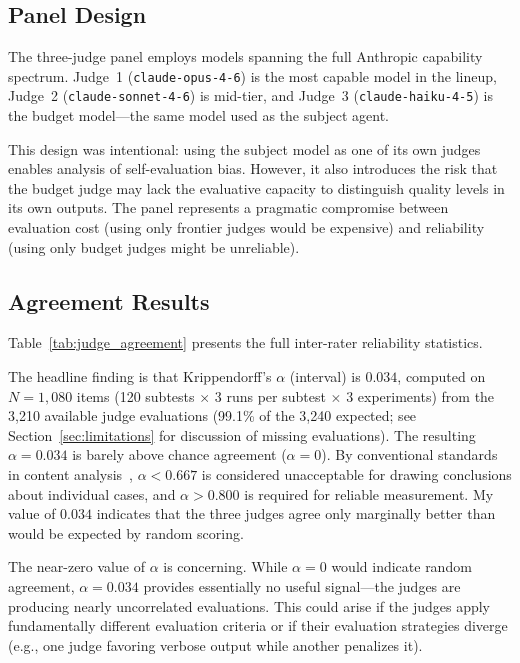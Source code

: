 \documentclass[11pt]{article}
\begin{document}
\subsection{Panel Design}
\label{sec:panel_design}

The three-judge panel employs models spanning the full Anthropic capability
spectrum. Judge~1 (\texttt{claude-opus-4-6}) is the most capable model in the
lineup, Judge~2 (\texttt{claude-sonnet-4-6}) is mid-tier, and Judge~3
(\texttt{claude-haiku-4-5}) is the budget model---the same model used as the
subject agent.

This design was intentional: using the subject model as one of its own judges
enables analysis of self-evaluation bias. However, it also introduces the
risk that the budget judge may lack the evaluative capacity to distinguish
quality levels in its own outputs. The panel represents a pragmatic
compromise between evaluation cost (using only frontier judges would be
expensive) and reliability (using only budget judges might be unreliable).

\subsection{Agreement Results}
\label{sec:agreement_results}

Table~\ref{tab:judge_agreement} presents the full inter-rater reliability
statistics.



The headline finding is that Krippendorff's $\alpha$ (interval) is $0.034$,
computed on $N=1{,}080$ items (120 subtests $\times$ 3 runs per subtest
$\times$ 3 experiments) from the 3,210 available judge evaluations
(99.1\% of the 3,240 expected; see Section~\ref{sec:limitations} for
discussion of missing evaluations).
The resulting $\alpha = 0.034$ is barely above chance agreement ($\alpha = 0$). By conventional
standards in content analysis~\cite{krippendorff2004content, polo2024efficient}, $\alpha < 0.667$ is
considered
unacceptable for drawing conclusions about individual cases, and
$\alpha > 0.800$ is required for reliable measurement. My value of $0.034$
indicates that the three judges agree only marginally better than would be
expected by random scoring.

The near-zero value of $\alpha$ is concerning. While $\alpha = 0$
would indicate random agreement, $\alpha = 0.034$ provides essentially no
useful signal---the judges are producing nearly uncorrelated evaluations.
This could arise if the judges apply fundamentally different evaluation
criteria or if their evaluation strategies diverge (e.g., one judge favoring
verbose output while another penalizes it).
\end{document}
